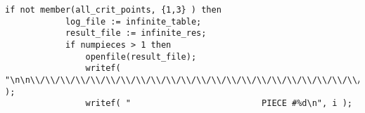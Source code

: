 \documentclass[a4paper,10pt]{article}
\begin{document}
\begin{lstlisting}[name=main]
        if not member(all_crit_points, {1,3} ) then
            log_file := infinite_table;
            result_file := infinite_res;
            if numpieces > 1 then
                openfile(result_file);
                writef( "\n\n\\/\\/\\/\\/\\/\\/\\/\\/\\/\\/\\/\\/\\/\\/\\/\\/\\/\\/\\/\\/\\/\\/\\/\\/\\/\\/\\/\\/\\/\\/\\/\\/\\/\\/\\/\\/\\/\\/\\/\\/\n" );
                writef( "                          PIECE #%d\n", i );

\end{lstlisting}
\end{document}
